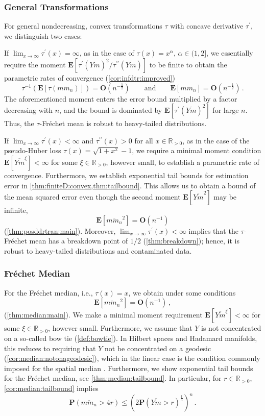 \documentclass{article}
\newcommand*{\mo}[1]{\mathbf{#1}}
\newcommand{\R}{\mathbb{R}}
\newcommand{\Rpp}{\R_{>0}}
\newcommand{\lab}{\left[} %
\newcommand{\rab}{\right]} %
\newcommand{\ab}[1]{\lab #1 \rab} %
\newcommand{\abOf}[1]{\!\ab{#1}} %
\newcommand{\lb}{\left(} %
\newcommand{\rb}{\right)} %
\newcommand{\br}[1]{\lb #1 \rb} %
\newcommand{\brOf}[1]{\!\br{#1}} %
\renewcommand{\Pr}{\mathbf{P}} %
\newcommand{\Prof}[1]{\Pr(#1)}
\newcommand{\PrOf}[1]{\Pr\brOf{#1}}
\newcommand{\E}{\mathbf{E}} %
\newcommand{\Eof}[1]{\E[#1]}
\newcommand{\EOf}[1]{\E\abOf{#1}}
\newcommand{\pr}{^\prime}
\newcommand{\prr}{^{\prime\prime}}
\newcommand{\eqcm}{\,,} %
\newcommand{\eqfs}{\,.}
\newcommand{\ol}[2]{\overline{#1#2}}
\newcommand{\tran}{\tau}
\newcommand{\dtran}{\tau\pr}
\newcommand{\ddtran}{\tau\prr}
\begin{document}
\subsubsection{General Transformations}
%
For general nondecreasing, convex transformations $\tran$ with concave derivative $\dtran$, we distinguish two cases:

If $\lim_{x\to\infty}\dtran(x) = \infty$, as in the case of $\tran(x)=x^\alpha$, $\alpha \in (1, 2]$, we essentially require the moment $\Eof{\dtran(\ol Ym)^2/\ddtran(\ol Ym)}$ to be finite to obtain the parametric rates of convergence (\cref{cor:infdtr:improved})
\begin{equation}
    \tran^{-1}\brOf{\EOf{\tran(\ol m{m_n})}} = \mo O\brOf{n^{-\frac12}}
    \qquad\text{and}\qquad 
    \EOf{\ol m{m_n}} = \mo O\brOf{n^{-\frac12}}
    \eqfs
\end{equation}
The aforementioned moment enters the error bound multiplied by a factor decreasing with $n$, and the bound is dominated by $\Eof{\dtran(\ol Ym)^2}$ for large $n$. Thus, the $\tran$-Fr\'echet mean is robust to heavy-tailed distributions.

If $\lim_{x\to\infty}\dtran(x) < \infty$ and $\ddtran(x)>0$ for all $x\in\Rpp$, as in the case of the pseudo-Huber loss $\tran(x)=\sqrt{1 + x^2}-1$, we require a minimal moment condition $\Eof{\ol Ym^\xi} < \infty$ for some $\xi \in\Rpp$, however small, to establish a parametric rate of convergence. Furthermore, we establish exponential tail bounds for estimation error in \cref{thm:finiteD:convex,thm:tailbound}. This allows us to obtain a bound of the mean squared error even though the second moment $\Eof{\ol Ym^2}$ may be infinite,
\begin{equation}
    \EOf{\ol m{m_n}^2} = \mo O\brOf{n^{-1}}
\end{equation}
(\cref{thm:posddrtran:main}).
Moreover, $\lim_{x\to\infty}\dtran(x) < \infty$ implies that the $\tran$-Fr\'echet mean has a breakdown point of $1/2$ (\cref{thm:breakdown}); hence, it is robust to heavy-tailed distributions and contaminated data.
%
%
%
\subsubsection{Fr\'echet Median}
%
For the Fr\'echet median, i.e., $\tran(x)=x$, we obtain under some conditions
\begin{equation}
	\EOf{\ol m{m_n}^2} = \mo O\brOf{n^{-1}}
    \eqcm
\end{equation}
(\cref{thm:median:main}).
We make a minimal moment requirement $\Eof{\ol Ym^\xi}<\infty$ for some $\xi\in\Rpp$, however small. Furthermore, we assume that $Y$ is not concentrated on a so-called bow tie
(\cref{def:bowtie}). In Hilbert spaces and Hadamard manifolds, this reduces
to requiring that $Y$ not be concentrated on a geodesic
(\cref{cor:median:notonageodesic}), which in the linear case is the condition
commonly imposed for the spatial median \cite{Chakraborty2014}.
Furthermore, we show exponential tail bounds for the Fr\'echet median, see \cref{thm:median:tailbound}. In particular, for $r \in\Rpp$, \cref{cor:median:tailbound} implies
\begin{equation}
	\PrOf{\ol m{m_n} > 4 r} \leq  \br{2\Prof{\ol Ym > r}^{\frac13}}^n
	\eqfs
\end{equation}
%
%
%
\end{document}
